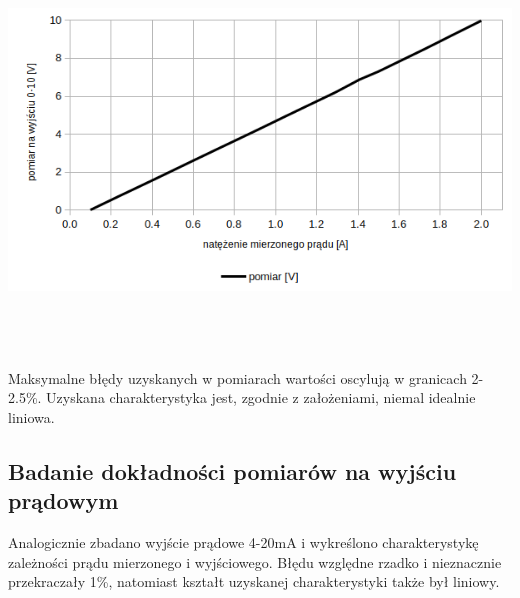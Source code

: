 \documentclass[12pt]{article}
\begin{document}
\begin{minipage}[c]{0.6\textwidth}
	\centering
	\includegraphics[width=\textwidth]{v_graph.png}
\end{minipage} \\ \\ \\

\noindent Maksymalne błędy uzyskanych w pomiarach wartości oscylują w granicach 2-2.5\%. Uzyskana charakterystyka jest, zgodnie z założeniami, niemal idealnie liniowa.

\subsection{Badanie dokładności pomiarów na wyjściu prądowym}
Analogicznie zbadano wyjście prądowe 4-20mA i wykreślono charakterystykę zależności prądu mierzonego i wyjściowego. Błędu względne rzadko i nieznacznie przekraczały 1\%, natomiast kształt uzyskanej charakterystyki także był liniowy.
\end{document}
